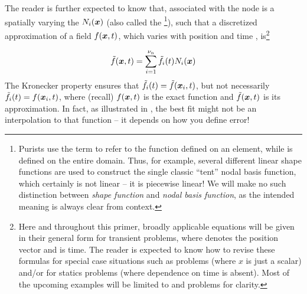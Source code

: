 %
The reader is further expected to know that, associated with the \ith node is a spatially varying the  ${N}_i(\bm{x})$ (also called the \footnote{Purists use the term  to refer to the function defined on an element, while  is defined on the entire domain. Thus, for example, several different linear shape functions are used to construct the single classic ``tent'' nodal basis function, which certainly is not linear -- it is piecewise linear! We will make no such distinction between \textit{shape function} and \textit{nodal basis function}, as the intended meaning is always clear from context.}), such that a discretized approximation of a field $f(\bm{x},{t})$, which varies with position \x and time \Time, is\footnote{Here and throughout this primer, broadly applicable equations will be given in their general form for transient \threeD problems, where \x denotes the position vector and \Time is time. The reader is expected to know how to revise these formulas for special case situations such as \oneD problems (where $x$ is just a scalar) and/or for statics problems (where dependence on time is absent). Most of the upcoming examples will be limited to \oneD and \twoD problems for clarity.}


\begin{equation}
  \tilde{f}(\bm{x},{t})=\sum\limits_{i=1}^{{\nu_\text{n}}} \tilde{f}_i({t}) {N}_i(\bm{x})
\label{eq:fieldOnGridc}
\end{equation}
{}
The Kronecker property ensures that $\tilde{f}_i({t})=\tilde{f}(\bm{x}_i,{t})$, but not necessarily \mbox{$\tilde{f}_i({t})=f(\bm{x}_i,{t})$,} where (recall) $f(\bm{x},t)$ is the exact function and $\tilde{f}(\bm{x},t)$ is its approximation. In fact, as illustrated in , the best fit might not be an interpolation to that function -- it depends on how you define error!

